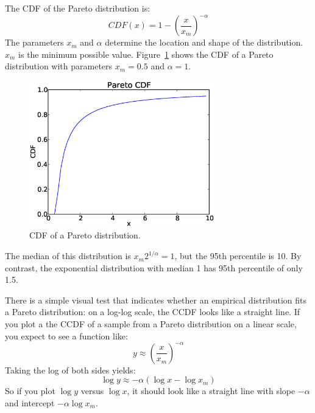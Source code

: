 \documentclass[12pt]{book}
\begin{document}

The CDF of the Pareto distribution is:
%
\[ CDF(x) = 1- \left( \frac{x}{x_m} \right) ^{-\alpha} \]
%
The parameters $x_m$ and $\alpha$ determine the location and shape of
the distribution.  $x_m$ is the minimum possible value.
Figure~\ref{pareto_cdf} shows the CDF of a Pareto distribution with
parameters $x_m = 0.5$ and $\alpha = 1$.


\begin{figure}
\centerline{\includegraphics[height=2.5in]{figs/pareto_cdf.eps}}
\caption{CDF of a Pareto distribution.}
\label{pareto_cdf}
\end{figure}

The median of this distribution is $x_m 2^{1/\alpha} = 1$, but the
95th percentile is 10.  By contrast, the exponential distribution
with median 1 has 95th percentile of only 1.5.


There is a simple visual test that indicates whether an empirical
distribution fits a Pareto distribution: on a log-log scale, the CCDF
looks like a straight line.
If you plot a the CCDF of a sample from a Pareto distribution on a
linear scale, you expect to see a function like:
%
\[ y \approx \left( \frac{x}{x_m} \right) ^{-\alpha} \]
%
Taking the log of both sides yields:
%
\[ \log y \approx -\alpha (\log x - \log x_m ) \]
%
So if you plot $\log y$ versus $\log x$, it should look like a
straight line with slope $-\alpha$ and intercept $-\alpha \log x_m$.
\end{document}
